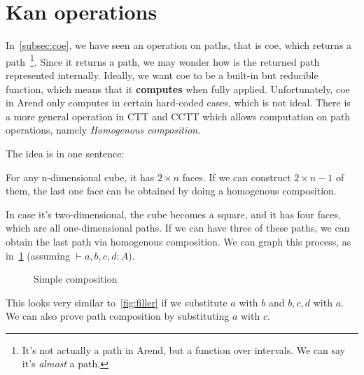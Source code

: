 \section{Kan operations}
\label{sec:kan}

In~\cref{subsec:coe}, we have seen an operation on paths,
that is \textsf{coe}, which returns a path~\footnote
{It's not actually a path in Arend, but a function over intervals.
  We can say it's \textit{almost} a path.}.
Since it returns a path, we may wonder how is the returned path
represented internally.
Ideally, we want \textsf{coe} to be a built-in but reducible function,
which means that it \textbf{computes} when fully applied.
Unfortunately, \textsf{coe} in Arend only computes in certain hard-coded cases,
which is not ideal.
There is a more general operation in CTT and CCTT which allows computation
on path operations, namely \textit{Homogenous composition}.

The idea is in one sentence:

\begin{displayquote}
  For any n-dimensional cube, it has $2 \times n$ faces.
  If we can construct $2 \times n - 1$ of them,
  the last one face can be obtained by doing a homogenous composition.
\end{displayquote}

In case it's two-dimensional, the cube becomes a square,
and it has four faces, which are all one-dimensional paths.
If we can have three of these paths,
we can obtain the last path via homogenous composition.
We can graph this process, as in~\cref{fig:simple-comp}
(assuming $\vdash a, b, c, d : A$).

\begin{figure}
\begin{center}
\end{center}
\caption{Simple composition}
\label{fig:simple-comp}
\end{figure}

This looks very similar to~\cref{fig:filler}
if we substitute $a$ with $b$ and $b, c, d$ with $a$.
We can also prove path composition by substituting $a$ with $c$.

